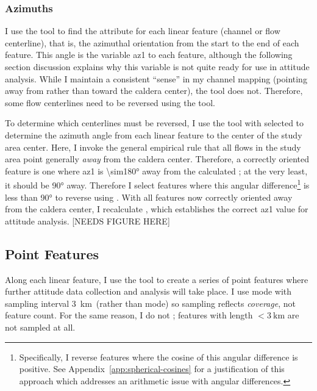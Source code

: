 \subsubsection{Azimuths}

I use the  tool to find the  attribute for each linear feature (channel or flow centerline), that is, the azimuthal orientation from the start to the end of each feature. This angle is the variable \ac{az1} to each feature, although the following section discussion explains why this variable is not quite ready for use in attitude analysis. While I maintain a consistent ``sense'' in my channel mapping (pointing away from rather than toward the caldera center), the  tool does not. Therefore, some flow centerlines need to be reversed using the  tool.

To determine which centerlines must be reversed, I use the  tool with  selected to determine the azimuth angle from each linear feature to the center of the study area \acs{center}. Here, I invoke the general empirical rule that all flows in the study area point generally \emph{away} from the caldera center. Therefore, a correctly oriented feature is one where \acs{az1} is \ang{\sim180} away from the calculated ; at the very least, it should be \ang{90} away. Therefore I select features where this angular difference\footnote{Specifically, I reverse features where the cosine of this angular difference is positive. See Appendix~\ref{app:spherical-cosines} for a justification of this approach which addresses an arithmetic issue with angular differences.} is less than \ang{90} to reverse using . With all features now correctly oriented away from the caldera center, I recalculate , which establishes the correct \ac{az1} value for attitude analysis. [NEEDS FIGURE HERE]

\subsection{Point Features}

\newcommand{\samplinginterval}{\qty{3}{\km}}

Along each linear feature, I use the  tool to create a series of point features where further attitude data collection and analysis will take place. I use  mode with sampling interval \samplinginterval\ (rather than  mode) so sampling reflects \emph{coverage}, not feature count. For the same reason, I do not ; features with length $<\samplinginterval$ are not sampled at all.

